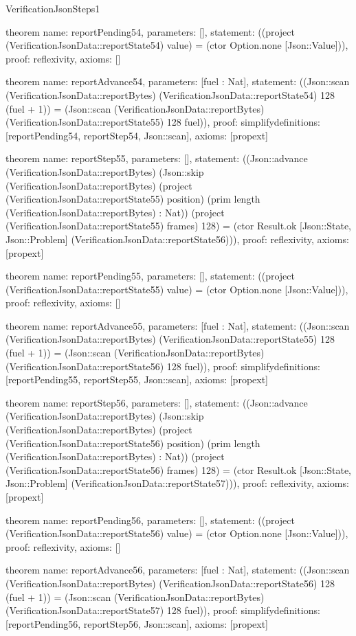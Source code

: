 \begin{lexlean}{VerificationJsonSteps1}
\begin{semanticmodule}
theorem{
  name: reportPending54,
  parameters: [],
  statement: ((project (VerificationJsonData::reportState54) value) = (ctor Option.none [Json::Value])),
  proof: reflexivity{},
  axioms: []
}

theorem{
  name: reportAdvance54,
  parameters: [fuel : Nat],
  statement: ((Json::scan (VerificationJsonData::reportBytes) (VerificationJsonData::reportState54) 128 (fuel + 1)) = (Json::scan (VerificationJsonData::reportBytes) (VerificationJsonData::reportState55) 128 fuel)),
  proof: simplify{definitions: [reportPending54, reportStep54, Json::scan]},
  axioms: [propext]
}

theorem{
  name: reportStep55,
  parameters: [],
  statement: ((Json::advance (VerificationJsonData::reportBytes) (Json::skip (VerificationJsonData::reportBytes) (project (VerificationJsonData::reportState55) position) (prim length (VerificationJsonData::reportBytes) : Nat)) (project (VerificationJsonData::reportState55) frames) 128) = (ctor Result.ok [Json::State, Json::Problem] (VerificationJsonData::reportState56))),
  proof: reflexivity{},
  axioms: [propext]
}

theorem{
  name: reportPending55,
  parameters: [],
  statement: ((project (VerificationJsonData::reportState55) value) = (ctor Option.none [Json::Value])),
  proof: reflexivity{},
  axioms: []
}

theorem{
  name: reportAdvance55,
  parameters: [fuel : Nat],
  statement: ((Json::scan (VerificationJsonData::reportBytes) (VerificationJsonData::reportState55) 128 (fuel + 1)) = (Json::scan (VerificationJsonData::reportBytes) (VerificationJsonData::reportState56) 128 fuel)),
  proof: simplify{definitions: [reportPending55, reportStep55, Json::scan]},
  axioms: [propext]
}

theorem{
  name: reportStep56,
  parameters: [],
  statement: ((Json::advance (VerificationJsonData::reportBytes) (Json::skip (VerificationJsonData::reportBytes) (project (VerificationJsonData::reportState56) position) (prim length (VerificationJsonData::reportBytes) : Nat)) (project (VerificationJsonData::reportState56) frames) 128) = (ctor Result.ok [Json::State, Json::Problem] (VerificationJsonData::reportState57))),
  proof: reflexivity{},
  axioms: [propext]
}

theorem{
  name: reportPending56,
  parameters: [],
  statement: ((project (VerificationJsonData::reportState56) value) = (ctor Option.none [Json::Value])),
  proof: reflexivity{},
  axioms: []
}

theorem{
  name: reportAdvance56,
  parameters: [fuel : Nat],
  statement: ((Json::scan (VerificationJsonData::reportBytes) (VerificationJsonData::reportState56) 128 (fuel + 1)) = (Json::scan (VerificationJsonData::reportBytes) (VerificationJsonData::reportState57) 128 fuel)),
  proof: simplify{definitions: [reportPending56, reportStep56, Json::scan]},
  axioms: [propext]
}


\end{semanticmodule}
\end{lexlean}
